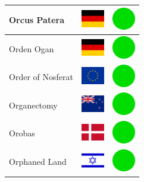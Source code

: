 \documentclass[12pt, a4paper, twoside]{report}
\begin{document}
\begin{center}
\begin{longtable}{|p{5cm}|p{2cm}|p{2cm}|}
 Orcus Patera                                               & \includegraphics[width=1cm]{../4x3/de} &   \includegraphics[width=1cm]{../likes/y} \\ \hline
 Orden Ogan                                                 & \includegraphics[width=1cm]{../4x3/de} &   \includegraphics[width=1cm]{../likes/y} \\ \hline
 Order of Nosferat                                          & \includegraphics[width=1cm]{../4x3/eu} &   \includegraphics[width=1cm]{../likes/y} \\ \hline
 Organectomy                                                & \includegraphics[width=1cm]{../4x3/nz} &   \includegraphics[width=1cm]{../likes/y} \\ \hline
 Orobas                                                     & \includegraphics[width=1cm]{../4x3/dk} &   \includegraphics[width=1cm]{../likes/y} \\ \hline
 Orphaned Land                                              & \includegraphics[width=1cm]{../4x3/il} &   \includegraphics[width=1cm]{../likes/y} \\ \hline

\end{longtable}
\end{center}
\end{document}
